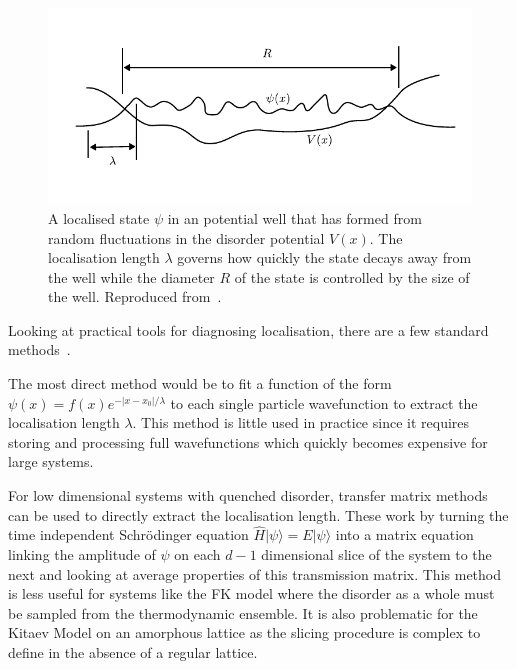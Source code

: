 \hypertarget{fig:localisation_radius_vs_length}{%
\begin{figure}
\centering
\includegraphics[width=1\textwidth,height=\textheight]{figure_code/background_chapter/localisation_radius_vs_length}
\caption[{Localisation length vs diameter}]{A localised state \(\psi\) in an potential well that has formed from random fluctuations in the disorder potential \(V(x)\). The localisation length \(\lambda\) governs how quickly the state decays away from the well while the diameter \(R\) of the state is controlled by the size of the well. Reproduced from~\autocite{kramerLocalizationTheoryExperiment1993}.}
\label{fig:localisation_radius_vs_length}
\end{figure}
}

Looking at practical tools for diagnosing localisation, there are a few standard methods~\autocite{kramerLocalizationTheoryExperiment1993}.

The most direct method would be to fit a function of the form \(\psi(x) = f(x) e^{-|x-x_0|/\lambda}\) to each single particle wavefunction to extract the localisation length \(\lambda\). This method is little used in practice since it requires storing and processing full wavefunctions which quickly becomes expensive for large systems.

For low dimensional systems with quenched disorder, transfer matrix methods can be used to directly extract the localisation length. These work by turning the time independent Schrödinger equation \(\hat{H}|\psi\rangle = E|\psi\rangle\) into a matrix equation linking the amplitude of \(\psi\) on each \(d-1\) dimensional slice of the system to the next and looking at average properties of this transmission matrix. This method is less useful for systems like the FK model where the disorder as a whole must be sampled from the thermodynamic ensemble. It is also problematic for the Kitaev Model on an amorphous lattice as the slicing procedure is complex to define in the absence of a regular lattice.


